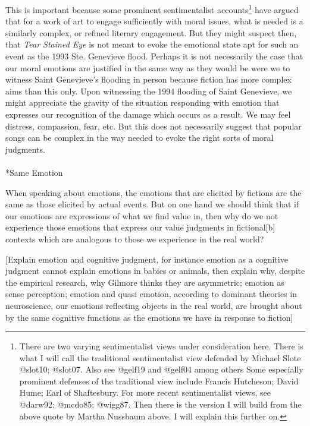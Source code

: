 \documentclass[
  letterpaper,
  DIV=11,
  numbers=noendperiod]{scrartcl}
\makeatletter
\let\oldparagraph\paragraph
\renewcommand{\paragraph}{
    \@ifstar
      \xxxParagraphStar
      \xxxParagraphNoStar
  }
\newcommand{\xxxParagraphStar}[1]{\oldparagraph*{#1}\mbox{}}
\newcommand{\xxxParagraphNoStar}[1]{\oldparagraph{#1}\mbox{}}
\theoremstyle{remark}
\makeatother
\begin{document}
This is important because some prominent sentimentalist
accounts\footnote{There are two varying sentimentalist views under
  consideration here. There is what I will call the traditional
  sentimentalist view defended by Michael Slote @slot10; @slot07. Also
  see @gelf19 and @gelf04 among others Some especially prominent
  defenses of the traditional view include Francis Hutcheson; David
  Hume; Earl of Shaftesbury. For more recent sentimentalist views, see
  @darw92; @mcdo85; @wigg87. Then there is the version I will build from
  the above quote by Martha Nussbaum above. I will explain this further
  on.} have argued that for a work of art to engage sufficiently with
moral issues, what is needed is a similarly complex, or refined literary
engagement. But they might suspect then, that \emph{Tear Stained Eye} is
not meant to evoke the emotional state apt for such an event as the 1993
Ste. Genevieve flood. Perhaps it is not necessarily the case that our
moral emotions are justified in the same way as they would be were we to
witness Saint Genevieve's flooding in person because fiction has more
complex aims than this only. Upon witnessing the 1994 flooding of Saint
Genevieve, we might appreciate the gravity of the situation responding
with emotion that expresses our recognition of the damage which occurs
as a result. We may feel distress, compassion, fear, etc. But this does
not necessarily suggest that popular songs can be complex in the way
needed to evoke the right sorts of moral judgments.

\paragraph*{Same Emotion}\label{same-emotion}

When speaking about emotions, the emotions that are elicited by fictions
are the same as those elicited by actual events. But on one hand we
should think that if our emotions are expressions of what we find value
in, then why do we not experience those emotions that express our value
judgments in fictional{[}b{]} contexts which are analogous to those we
experience in the real world?

{[}Explain emotion and cognitive judgment, for instance emotion as a
cognitive judgment cannot explain emotions in babies or animals, then
explain why, despite the empirical research, why Gilmore thinks they are
asymmetric; emotion as sense perception; emotion and quasi emotion,
according to dominant theories in neuroscience, our emotions reflecting
objects in the real world, are brought about by the same cognitive
functions as the emotions we have in response to fiction{]}
\end{document}
